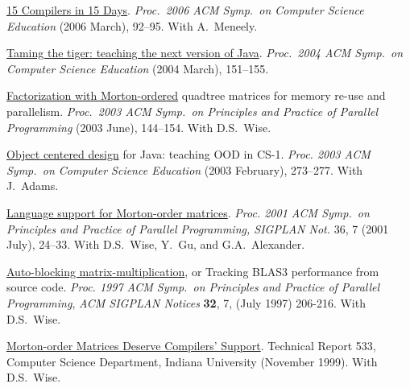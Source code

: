 \documentclass[ComputerScience]{vita}
\begin{document}
\begin{vita}
\begin{Publications}
  \begin{Papers at Refereed Conferences}
	
  \item \href{http://doi.acm.org/10.1145/1121341.1121372}{15 Compilers in 15 Days}.  \textit{Proc.\ 2006 ACM Symp.\ on Computer Science Education} (2006 March), 92--95.  With A.~Meneely.

  \item \href{http://doi.acm.org/10.1145/971300.971356}{Taming the tiger: teaching the next version of Java}.  \textit{Proc.\ 2004 ACM Symp.\ on Computer Science Education} (2004 March), 151--155.  

  \item \href{http://doi.acm.org/10.1145/781498.781525}{Factorization with Morton-ordered} quadtree matrices for memory re-use and parallelism. \textit{Proc.\ 2003 ACM Symp.\ on Principles and Practice of Parallel Programming} (2003 June), 144--154.  With D.S.\ Wise.

  \item \href{http://doi.acm.org/10.1145/611892.611986}{Object centered design} for Java: teaching OOD in CS-1. \textit{Proc. 2003 ACM Symp.\ on Computer Science Education} (2003 February), 273--277.  With J.\ Adams.

  \item \href{http://doi.acm.org/10.1145/379539.379559}{Language support for Morton-order matrices}. \textit{Proc. 2001 ACM Symp.\ on Principles and Practice of Parallel Programming, SIGPLAN Not.} 36, 7 (2001 July), 24--33.  With D.S.\ Wise, Y.\ Gu, and G.A.\ Alexander.

  \item \href{http://doi.acm.org/10.1145/263764.263789}{Auto-blocking matrix-multiplication}, or Tracking BLAS3 performance from source code. \textit{Proc. 1997 ACM Symp.\ on Principles and Practice of Parallel Programming\nocorr}, \textit{ACM SIGPLAN Notices} \textbf{32}, 7, (July 1997) 206-216.  With D.S.~Wise.

  \end{Papers at Refereed Conferences}

  \begin{Technical Reports}

  \item \href{http://www.cs.indiana.edu/Research/techreports/TR533.shtml}{Morton-order Matrices Deserve Compilers' Support}. Technical Report 533, Computer Science Department, Indiana University (November 1999).  With D.S.~Wise.


\end{Technical Reports}
\end{Publications}
\end{vita}
\end{document}
